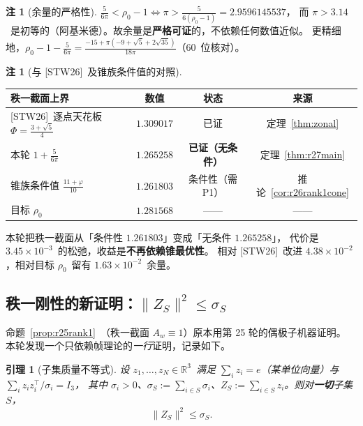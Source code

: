 \documentclass[UTF8,11pt]{ctexart}
\newtheorem{lemma}[theorem]{引理}
\theoremstyle{definition}
\newtheorem{remark}[theorem]{注}
\newcommand{\R}{\mathbb{R}}
\newcommand{\STW}{\textup{[STW26]}}
\begin{document}
\begin{remark}[余量的严格性]\label{rem:r27margin}
$\frac5{6\pi}<\rho_0-1\iff\pi>\frac5{6(\rho_0-1)}=2.9596145537$，
而 $\pi>3.14$~是初等的（阿基米德）。故余量是\textbf{严格可证}的，不依赖任何数值近似。
更精细地，$\rho_0-1-\frac5{6\pi}=\frac{-15+\pi(-9+\sqrt5+2\sqrt{35})}{18\pi}$（$60$~位核对）。
\end{remark}

\begin{remark}[与 \STW\ 及锥族条件值的对照]\label{rem:r27compare}
\begin{center}\small
\begin{tabular}{lccc}
\toprule
秩一截面上界 & 数值 & 状态 & 来源\\
\midrule
\STW\ 逐点天花板 $\Phi=\frac{3+\sqrt5}4$ & $1.309017$ & 已证 & 定理~\ref{thm:zonal}\\
本轮 $1+\frac5{6\pi}$ & $1.265258$ & \textbf{已证（无条件）} & 定理~\ref{thm:r27main}\\
锥族条件值 $\frac{11+\varphi}{10}$ & $1.261803$ & 条件性（需 P1） & 推论~\ref{cor:r26rank1cone}\\
目标 $\rho_0$ & $1.281568$ & —— & ——\\
\bottomrule
\end{tabular}
\end{center}
本轮把秩一截面从「条件性 $1.261803$」变成「无条件 $1.265258$」，
代价是 $3.45\times10^{-3}$~的松弛，收益是\textbf{不再依赖锥最优性}。
相对 \STW\ 改进 $4.38\times10^{-2}$，相对目标 $\rho_0$~留有 $1.63\times10^{-2}$~余量。
\end{remark}

\subsection{秩一刚性的新证明：$\|Z_S\|^2\le\sigma_S$}\label{sec:r27:zs}

命题~\ref{prop:r25rank1}~（秩一截面 $A_w\equiv1$）原本用第 25 轮的偶极子机器证明。
本轮发现一个只依赖帧理论的\emph{一行}证明，记录如下。

\begin{lemma}[子集质量不等式]\label{lem:r27zs}
设 $z_1,\dots,z_N\in\R^3$~满足 $\sum_iz_i=e$（某单位向量）与 $\sum_iz_iz_i^\top/\sigma_i=I_3$，
其中 $\sigma_i>0$、$\sigma_S:=\sum_{i\in S}\sigma_i$、$Z_S:=\sum_{i\in S}z_i$。则对\textbf{一切}子集 $S$，
\begin{equation}\label{eq:r27zs}
\|Z_S\|^2\le\sigma_S .
\end{equation}
\end{lemma}
\end{document}
